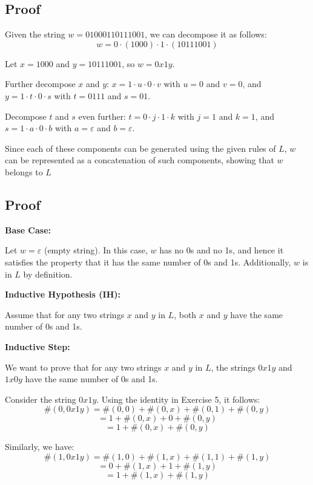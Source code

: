 \documentclass[12pt]{article}
\begin{document}
\subsection{Proof}
Given the string \(w = 01000110111001\), we can decompose it as follows:
\begin{equation*}
    w = 0 \cdot (1000) \cdot 1 \cdot (10111001)
\end{equation*}

Let \(x = 1000\) and \(y = 10111001\), so \(w = 0x1y\).

Further decompose \(x\) and \(y\): \(x = 1 \cdot u \cdot 0 \cdot v\) with \(u = 0\) and \(v = 0\), and \(y = 1 \cdot t \cdot 0 \cdot s\) with \(t = 0111\) and \(s = 01\).

Decompose \(t\) and \(s\) even further: \(t = 0 \cdot j \cdot 1 \cdot k\) with \(j = 1\) and \(k = 1\), and \(s = 1 \cdot a \cdot 0 \cdot b\) with \(a = \varepsilon\) and \(b = \varepsilon\).

Since each of these components can be generated using the given rules of \(L\), \(w\) can be represented as a concatenation of such components, showing that \(w\) belongs to \(L\)


\subsection{Proof}

\textbf{Base Case:}

Let \(w = \varepsilon\) (empty string). In this case, \(w\) has no 0s and no 1s, and hence it satisfies the property that it has the same number of 0s and 1s. Additionally, \(w\) is in \(L\) by definition.

\textbf{Inductive Hypothesis (IH):}

Assume that for any two strings \(x\) and \(y\) in \(L\), both \(x\) and \(y\) have the same number of 0s and 1s.

\textbf{Inductive Step:}

We want to prove that for any two strings \(x\) and \(y\) in \(L\), the strings \(0x1y\) and \(1x0y\) have the same number of 0s and 1s.

Consider the string \(0x1y\). Using the identity in Exercise 5, it follows:
\[
\#(0,0x1y) = \#(0,0) + \#(0,x) + \#(0,1) + \#(0,y)
\]
\[
= 1 + \#(0,x) + 0 + \#(0,y)
\]
\[
= 1 + \#(0,x) + \#(0,y)
\]

Similarly, we have:
\[
\#(1,0x1y) = \#(1,0) + \#(1,x) + \#(1,1) + \#(1,y)
\]
\[
= 0 + \#(1,x) + 1 + \#(1,y)
\]
\[
= 1 + \#(1,x) + \#(1,y)
\]
\end{document}
